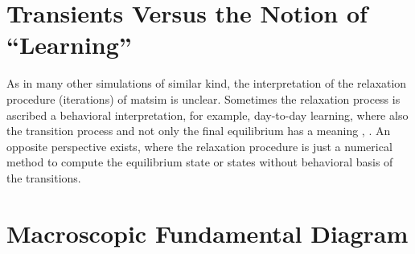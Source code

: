 \section{Transients Versus the Notion of ``Learning''}
\label{sec:transients-vs-learning}

As in many other simulations of similar kind, the interpretation of the relaxation procedure (iterations) of \gls{matsim} is unclear. 
%
Sometimes the relaxation process is ascribed a behavioral interpretation, for example, day-to-day learning, where also the transition process and not only the final equilibrium has a meaning \citep[][p.128]{LiuEtAl_TransResA_2006}, \citep[][p.523]{NagelBarrett1997feedback}. 
%
An opposite perspective exists, where the relaxation procedure is just a numerical method to compute the equilibrium state or states without behavioral basis of the transitions.


\section{Macroscopic Fundamental Diagram}
\label{sec:researchavenues-mfd}




